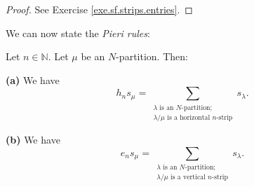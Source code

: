 \begin{proof}
See Exercise \ref{exe.sf.strips.entries}.
\end{proof}

We can now state the \emph{Pieri rules}:

\begin{theorem}
\label{thm.sf.pieri}Let $n\in\mathbb{N}$. Let $\mu$ be an
$N$-partition. Then: \medskip

\textbf{(a)} We have%
\[
h_{n}s_{\mu}=\sum_{\substack{\lambda\text{ is an }N\text{-partition;}%
\\\lambda/\mu\text{ is a horizontal }n\text{-strip}}}s_{\lambda}.
\]


\textbf{(b)} We have%
\[
e_{n}s_{\mu}=\sum_{\substack{\lambda\text{ is an }N\text{-partition;}%
\\\lambda/\mu\text{ is a vertical }n\text{-strip}}}s_{\lambda}.
\]

\end{theorem}

